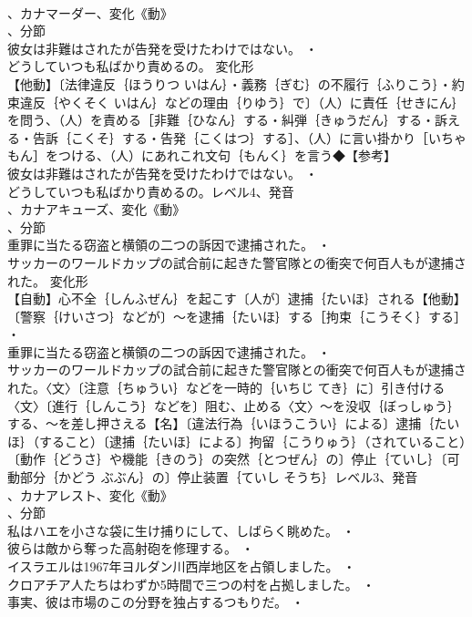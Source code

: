 \documentclass[8pt]{extreport}
\begin{document}
\begin{CJK}{UTF8}{min}
\\	、カナマーダー、変化《動》
\\	、分節
\\	彼女は非難はされたが告発を受けたわけではない。 ・
\\	どうしていつも私ばかり責めるの。	変化形 
\\	【他動】〔法律違反｛ほうりつ いはん｝・義務｛ぎむ｝の不履行｛ふりこう｝・約束違反｛やくそく いはん｝などの理由｛りゆう｝で〕（人）に責任｛せきにん｝を問う、（人）を責める［非難｛ひなん｝する・糾弾｛きゅうだん｝する・訴える・告訴｛こくそ｝する・告発｛こくはつ｝する］、（人）に言い掛かり［いちゃもん］をつける、（人）にあれこれ文句｛もんく｝を言う◆【参考】
\\	彼女は非難はされたが告発を受けたわけではない。 ・
\\	どうしていつも私ばかり責めるの。レベル4、発音
\\	、カナアキューズ、変化《動》
\\	、分節
\\	重罪に当たる窃盗と横領の二つの訴因で逮捕された。 ・
\\	サッカーのワールドカップの試合前に起きた警官隊との衝突で何百人もが逮捕された。	変化形 
\\	【自動】心不全｛しんふぜん｝を起こす〔人が〕逮捕｛たいほ｝される【他動】〔警察｛けいさつ｝などが〕～を逮捕｛たいほ｝する［拘束｛こうそく｝する］ ・
\\	重罪に当たる窃盗と横領の二つの訴因で逮捕された。 ・
\\	サッカーのワールドカップの試合前に起きた警官隊との衝突で何百人もが逮捕された。〈文〉〔注意｛ちゅうい｝などを一時的｛いちじ てき｝に〕引き付ける〈文〉〔進行｛しんこう｝などを〕阻む、止める〈文〉～を没収｛ぼっしゅう｝する、～を差し押さえる【名】〔違法行為｛いほうこうい｝による〕逮捕｛たいほ｝（すること）〔逮捕｛たいほ｝による〕拘留｛こうりゅう｝（されていること）〔動作｛どうさ｝や機能｛きのう｝の突然｛とつぜん｝の〕停止｛ていし｝〔可動部分｛かどう ぶぶん｝の〕停止装置｛ていし そうち｝レベル3、発音
\\	、カナアレスト、変化《動》
\\	、分節
\\	私はハエを小さな袋に生け捕りにして、しばらく眺めた。 ・
\\	彼らは敵から奪った高射砲を修理する。 ・
\\	イスラエルは1967年ヨルダン川西岸地区を占領しました。 ・
\\	クロアチア人たちはわずか5時間で三つの村を占拠しました。 ・
\\	事実、彼は市場のこの分野を独占するつもりだ。 ・

\end{CJK}
\end{document}
